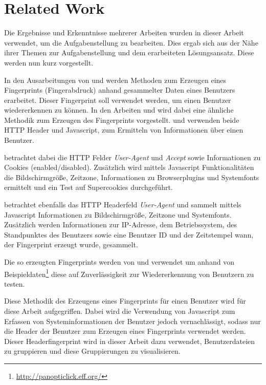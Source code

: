 \documentclass[
    fontsize=12pt,
    headings=small,
    parskip=half,           %
    bibliography=totoc,
    numbers=noenddot,       %
    open=any,               %
    ]{scrreprt}
\begin{document}
\chapter{Related Work}
Die Ergebnisse und Erkenntnisse mehrerer Arbeiten wurden in dieser Arbeit verwendet, um die Aufgabenstellung zu bearbeiten.
Dies ergab sich aus der Nähe ihrer Themen zur Aufgabenstellung und dem erarbeiteten Lösungsansatz.
Diese werden nun kurz vorgestellt.

In den Ausarbeitungen von \textcite{Ecke10} und \textcite{Boda} werden Methoden zum Erzeugen eines Fingerprints (Fingerabdruck) anhand gesammelter Daten eines Benutzers erarbeitet. 
Dieser Fingerprint soll verwendet werden, um einen Benutzer wiedererkennen zu können.
In den Arbeiten \cite{Ecke10} und \cite{Boda} wird dabei eine ähnliche Methodik zum Erzeugen des Fingerprints vorgestellt.
\textcite{Ecke10} und \textcite{Boda} verwenden beide HTTP Header und Javascript, zum Ermitteln von Informationen über einen Benutzer.

\textcite{Ecke10} betrachtet dabei die HTTP Felder \textit{User-Agent} und \textit{Accept} sowie Informationen zu Cookies (enabled/disabled).
Zusätzlich wird mittels Javascript Funktionalitäten die Bildschirmgröße, Zeitzone, Informationen zu Browserplugins und Systemfonts ermittelt und ein Test auf Supercookies durchgeführt. \cite[p. 4-5]{Ecke10}

\textcite{Boda} betrachtet ebenfalls das HTTP Headerfeld \textit{User-Agent} und sammelt mittels Javascript Informationen zu Bildschirmgröße, Zeitzone und Systemfonts.
Zusätzlich werden Informationen zur IP-Adresse, dem Betriebssystem, des Standpunktes des Benutzers sowie eine Benutzer ID und der Zeitstempel wann, der Fingerprint erzeugt wurde, gesammelt. \cite[p. 4-6]{Boda}

Die so erzeugten Fingerprints werden von \textcite{Ecke10} und \textcite{Boda} verwendet um anhand von Beispieldaten\footnote{\url{http://panopticlick.eff.org/}} diese auf Zuverlässigkeit zur Wiedererkennung von Benutzern zu testen.

Diese Methodik des Erzeugens eines Fingerprints für einen Benutzer wird für diese Arbeit aufgegriffen.
Dabei wird die Verwendung von Javascript zum Erfassen von Systeminformationen der Benutzer jedoch vernachlässigt, sodass nur die Header der Benutzer zum Erzeugen eines Fingerprints verwendet werden.
Dieser Headerfingerprint wird in dieser Arbeit dazu verwendet, Benutzerdateien zu gruppieren und diese Gruppierungen zu visualisieren.
\end{document}
